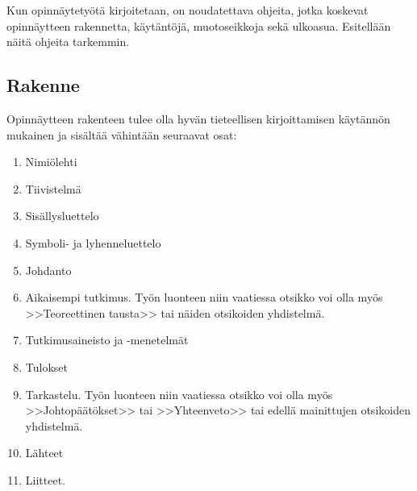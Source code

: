 \documentclass[english,12pt,a4paper,pdftex,elec,utf8]{aaltothesis}
\begin{document}
Kun opinn\"aytety\"ot\"a kirjoitetaan, on noudatettava 
ohjeita, jotka koskevat opinn\"aytteen rakennetta,
k\"ayt\"ant\"oj\"a, muotoseikkoja sek\"a ulkoasua. Esitell\"a\"an n\"ait\"a
ohjeita tarkemmin.


\subsection*{Rakenne}

Opinn\"aytteen rakenteen tulee olla hyv\"an tieteellisen
kirjoittamisen k\"ayt\"ann\"on mukainen ja sis\"alt\"a\"a v\"ahint\"a\"an seuraavat
osat:

\begin{enumerate}
\item Nimi\"olehti
\item Tiivistelm\"a
\item Sis\"allysluettelo
\item Symboli- ja lyhenneluettelo
\item \label{a} Johdanto
\item  Aikaisempi tutkimus. Ty\"on luonteen niin vaatiessa otsikko voi olla my\"os
        >>Teoreettinen tausta>>  tai n\"aiden otsikoiden yhdistelm\"a.
\item Tutkimusaineisto ja -menetelm\"at %
\item Tulokset
\item \label{o} Tarkastelu. Ty\"on luonteen niin vaatiessa otsikko voi
      olla my\"os >>Johtop\"a\"at\"okset>> tai >>Yhteenveto>> 
      tai edell\"a mainittujen otsikoiden yhdistelm\"a.
\item L\"ahteet
\item Liitteet.
\end{enumerate}
\end{document}
